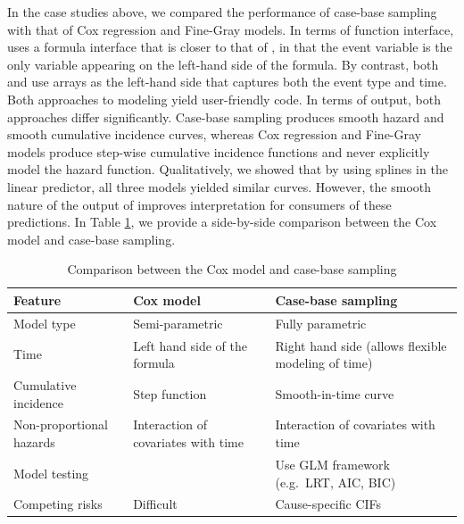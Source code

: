 \documentclass[
]{jss}
\begin{document}
In the case studies above, we compared the performance of case-base
sampling with that of Cox regression and Fine-Gray models. In terms of
function interface,  uses a formula interface that is
closer to that of , in that the event variable is the only
variable appearing on the left-hand side of the formula. By contrast,
both  and  use arrays as
the left-hand side that captures both the event type and time. Both
approaches to modeling yield user-friendly code. In terms of output,
both approaches differ significantly. Case-base sampling produces smooth
hazard and smooth cumulative incidence curves, whereas Cox regression
and Fine-Gray models produce step-wise cumulative incidence functions
and never explicitly model the hazard function. Qualitatively, we showed
that by using splines in the linear predictor, all three models yielded
similar curves. However, the smooth nature of the output of
 improves interpretation for consumers of these
predictions. In Table \ref{tab:compCBvsCox}, we provide a side-by-side
comparison between the Cox model and case-base sampling.

\begin{table}
\caption{\label{tab:compCBvsCox}Comparison between the Cox model and case-base sampling}
\centering
\begin{tabular}[t]{llp{5cm}}
\toprule
Feature & Cox model & Case-base sampling\\
\midrule
Model type & Semi-parametric & Fully parametric\\
Time & Left hand side of the formula & Right hand side (allows flexible modeling of time)\\
Cumulative incidence & Step function & Smooth-in-time curve\\
Non-proportional hazards & Interaction of covariates with time & Interaction of covariates with time\\
Model testing &  & Use GLM framework \newline (e.g.\ LRT, AIC, BIC)\\
\addlinespace
Competing risks & Difficult & Cause-specific CIFs\\
\bottomrule
\end{tabular}
\end{table}
\end{document}
